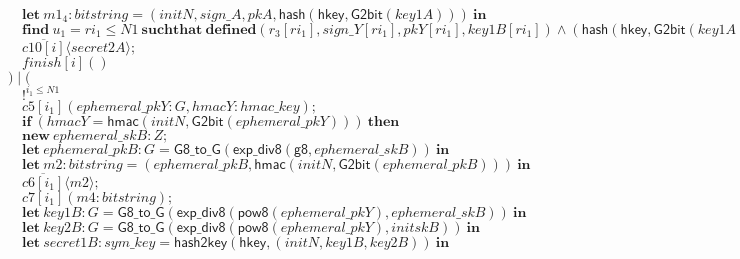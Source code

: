 \documentclass{article}
\newcommand{\cinput}[2]{{#1}({#2})}
\newcommand{\coutput}[2]{\overline{#1}\langle{#2}\rangle}
\newcommand{\kw}[1]{\mathbf{#1}}
\newcommand{\kwf}[1]{\mathsf{#1}}
\newcommand{\var}[1]{\mathit{#1}}
\newcommand{\kwt}[1]{\mathit{#1}}
\newcommand{\kwp}[1]{\mathit{#1}}
\newcommand{\kwc}[1]{\mathit{#1}}
\begin{document}
\begin{tabbing}
\>$\quad \kw{let}\ \var{m1}_{4}: \kwt{bitstring} = \kwf{}(\var{initN}, \var{sign{\_}A}, \var{pkA}, \kwf{hash}(\kwf{hkey}, \kwf{G2bit}(\var{key1A})))\ \kw{in}$\\
\>$\quad \kw{find}\ \var{u}_{1} = \var{ri}_{1} \leq \kwp{N1}\ \kw{suchthat}\ \kw{defined}(\var{r}_{3}[\var{ri}_{1}], \var{sign{\_}Y}[\var{ri}_{1}], \var{pkY}[\var{ri}_{1}], \var{key1B}[\var{ri}_{1}])\wedge (\kwf{hash}(\kwf{hkey}, \kwf{G2bit}(\var{key1A}))  =  \kwf{hash}(\kwf{hkey}, \kwf{G2bit}(\var{key1B}[\var{ri}_{1}]))) \wedge  (\var{pkA}  =  \var{pkY}[\var{ri}_{1}]) \wedge  (\var{sign{\_}A}  =  \var{sign{\_}Y}[\var{ri}_{1}]) \wedge  \kwf{check2}(\var{m1}_{4}, \kwf{pkgen2}(\var{initsignB}), \var{sign{\_}B})\ \kw{then}$\\
\>$\quad \coutput{\kwc{c10}[\var{i}]}{\var{secret2A}};$\\
\>$\quad \cinput{\kwc{finish}[\var{i}]}{}$\\
\>$) \mid ($\\
\>$\quad !^{\var{i}_{1} \leq \kwp{N1}}$\\
\>$\quad \cinput{\kwc{c5}[\var{i}_{1}]}{\var{ephemeral{\_}pkY}: \kwt{G}, \var{hmacY}: \kwt{hmac{\_}key}};$\\
\>$\quad \kw{if}\ (\var{hmacY}  =  \kwf{hmac}(\var{initN}, \kwf{G2bit}(\var{ephemeral{\_}pkY})))\ \kw{then}$\\
\>$\quad \kw{new}\ \var{ephemeral{\_}skB}: \kwt{Z};$\\
\>$\quad \kw{let}\ \var{ephemeral{\_}pkB}: \kwt{G} = \kwf{G8{\_}to{\_}G}(\kwf{exp{\_}div8}(\kwf{g8}, \var{ephemeral{\_}skB}))\ \kw{in}$\\
\>$\quad \kw{let}\ \var{m2}: \kwt{bitstring} = \kwf{}(\var{ephemeral{\_}pkB}, \kwf{hmac}(\var{initN}, \kwf{G2bit}(\var{ephemeral{\_}pkB})))\ \kw{in}$\\
\>$\quad \coutput{\kwc{c6}[\var{i}_{1}]}{\var{m2}};$\\
\>$\quad \cinput{\kwc{c7}[\var{i}_{1}]}{\var{m4}: \kwt{bitstring}};$\\
\>$\quad \kw{let}\ \var{key1B}: \kwt{G} = \kwf{G8{\_}to{\_}G}(\kwf{exp{\_}div8}(\kwf{pow8}(\var{ephemeral{\_}pkY}), \var{ephemeral{\_}skB}))\ \kw{in}$\\
\>$\quad \kw{let}\ \var{key2B}: \kwt{G} = \kwf{G8{\_}to{\_}G}(\kwf{exp{\_}div8}(\kwf{pow8}(\var{ephemeral{\_}pkY}), \var{initskB}))\ \kw{in}$\\
\>$\quad \kw{let}\ \var{secret1B}: \kwt{sym{\_}key} = \kwf{hash2key}(\kwf{hkey}, \kwf{}(\var{initN}, \var{key1B}, \var{key2B}))\ \kw{in}$\\

\end{tabbing}
\end{document}
